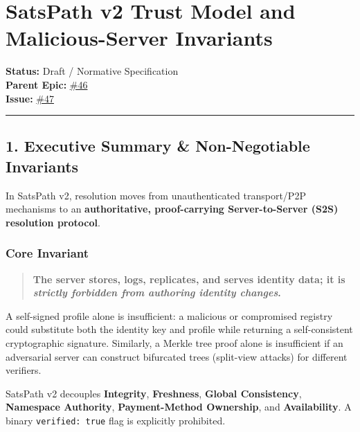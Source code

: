 \documentclass[
]{article}
\author{}
\date{}
\begin{document}
\hypertarget{satspath-v2-trust-model-and-malicious-server-invariants}{%
\section{SatsPath v2 Trust Model and Malicious-Server
Invariants}\label{satspath-v2-trust-model-and-malicious-server-invariants}}

\textbf{Status:} Draft / Normative Specification\\
\textbf{Parent Epic:}
\href{https://github.com/Truja503/satspath/issues/46}{\#46}\\
\textbf{Issue:}
\href{https://github.com/Truja503/satspath/issues/47}{\#47}

\begin{center}\rule{0.5\linewidth}{0.5pt}\end{center}

\hypertarget{executive-summary-non-negotiable-invariants}{%
\subsection{1. Executive Summary \& Non-Negotiable
Invariants}\label{executive-summary-non-negotiable-invariants}}

In SatsPath v2, resolution moves from unauthenticated transport/P2P
mechanisms to an \textbf{authoritative, proof-carrying Server-to-Server
(S2S) resolution protocol}.

\hypertarget{core-invariant}{%
\subsubsection{Core Invariant}\label{core-invariant}}

\begin{quote}
\textbf{The server stores, logs, replicates, and serves identity data;
it is \emph{strictly forbidden from authoring identity changes}.}
\end{quote}

A self-signed profile alone is insufficient: a malicious or compromised
registry could substitute both the identity key and profile while
returning a self-consistent cryptographic signature. Similarly, a Merkle
tree proof alone is insufficient if an adversarial server can construct
bifurcated trees (split-view attacks) for different verifiers.

SatsPath v2 decouples \textbf{Integrity}, \textbf{Freshness},
\textbf{Global Consistency}, \textbf{Namespace Authority},
\textbf{Payment-Method Ownership}, and \textbf{Availability}. A binary
\texttt{verified:\ true} flag is explicitly prohibited.
\end{document}
